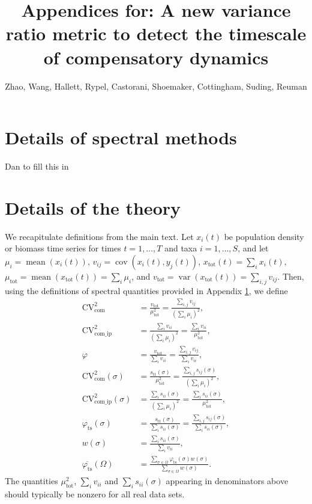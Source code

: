\documentclass[letterpaper,11pt]{article}
\newcommand{\var}{{\operatorname{var}}}
\newcommand{\cov}{{\operatorname{cov}}}
\newcommand{\mean}{{\operatorname{mean}}}
\begin{document}
\title{Appendices for: A new variance ratio metric to detect the timescale of compensatory dynamics}
\author{Zhao, Wang, Hallett, Rypel, Castorani, Shoemaker, Cottingham, Suding, Reuman}
\date{}
\maketitle

\section{Details of spectral methods}\label{sec:spec}
\noindent Dan to fill this in

\section{Details of the theory}
\noindent We recapitulate definitions from the main text. Let $x_i(t)$ be population 
density or biomass time series for times $t=1,\ldots,T$ and taxa $i=1,\ldots,S$, and 
let $\mu_i=\mean(x_i (t))$, $v_{ij}=\cov(x_i (t),y_j (t))$, $x_{\text{tot}} (t)=\sum_i x_i(t)$, $\mu_{\text{tot}}=\mean(x_{\text{tot}}(t))=\sum_i \mu_i$, and $v_{\text{tot}}=\var(x_{\text{tot}}(t))=\sum_{i,j}v_{ij}$. Then, using the definitions of spectral quantities provided in Appendix \ref{sec:spec}, we define
\begin{align}
\text{CV}_{\text{com}}^2 &= \frac{v_{\text{tot}}}{\mu_{\text{tot}}^2}=\frac{\sum_{i,j}v_{ij}}{(\sum_i \mu_i)^2},\\
\text{CV}_{\text{com\_ip}}^2 &=\frac{\sum_{i}v_{ii}}{(\sum_i \mu_i)^2}
=\frac{\sum_{i}v_{ii}}{\mu_{\text{tot}}^2},\\
\varphi &= \frac{v_{\text{tot}}}{\sum_i v_{ii}}
=\frac{\sum_{i,j}v_{ij}}{\sum_i v_{ii}}, \\
\text{CV}_{\text{com}}^2(\sigma) &= \frac{s_{\text{tt}}(\sigma)}{\mu_{\text{tot}}^2}
=\frac{\sum_{i,j} s_{ij}(\sigma)}{(\sum_i \mu_{i})^2},\\
\text{CV}_{\text{com\_ip}}^2(\sigma) &= \frac{\sum_i s_{ii}(\sigma)}{(\sum_i \mu_{i})^2}
=\frac{\sum_{i}s_{ii}(\sigma)}{\mu_{\text{tot}}^2},\\
\varphi_{\text{ts}}(\sigma) &= \frac{s_{\text{tt}}(\sigma)}{\sum_i s_{ii}(\sigma)}
=\frac{\sum_{i,j}s_{ij}(\sigma)}{\sum_i s_{ii}(\sigma)},\\
w(\sigma) &= \frac{\sum_i s_{ii}(\sigma)}{\sum_i v_{ii}},\\
\overline{\varphi_{\text{ts}}}(\Omega) &= \frac{\sum_{\sigma \in \Omega} \varphi_{\text{ts}}(\sigma) w(\sigma)}
{\sum_{\sigma \in \Omega} w(\sigma)}.
\end{align}
The quantities $\mu_{\text{tot}}^2$, $\sum_i v_{ii}$ and 
$\sum_i s_{ii}(\sigma)$ appearing in denominators above 
should typically be nonzero for all real data sets. 
\end{document}

